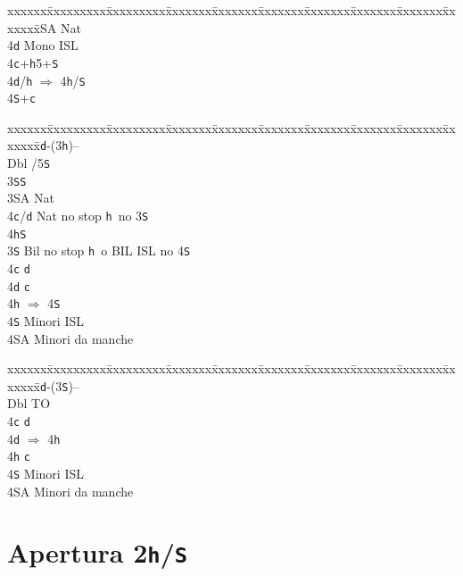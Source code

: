 \documentclass[a4paper,italian]{article}
\newcommand{\BS}{\small{\texttt{S}}}
\newcommand{\BC}{\small{\texttt{c}}}
\newcommand{\BD}{\small{\texttt{d}}}
\newcommand{\BH}{\small{\texttt{h}}}
\newcommand{\pdfh}{\texorpdfstring{\texttt{h}}{H}}
\newcommand{\pdfs}{\texorpdfstring{\texttt{S}}{S}}
\newenvironment{bidtable}
{\begin{tabbing}

    xxxxxx\=xxxxxxxxx\=xxxxxxxxx\=xxxxxxx\=xxxxxxx\=xxxxxxx\=xxxxxxx\=xxxxxxx\=xxxxxxx\=xxxxxxx\=\kill}
{\end{tabbing} }%
\begin{document}
\begin{multicols}{2}
\begin{bidtable}
        3\small{SA} \> Nat\+\\
        4\BD \> Mono ISL\-\-\\
        4\BC {}+\BH5+\BS\\
        4\BD/\BH \> $\Rightarrow$ 4\BH /\BS \\
        4\BS {}+\BC \-
    \end{bidtable}
    \begin{bidtable}
        2\BD-(3\BH)--\+\\
        Dbl /5\BS\ \+\\
        3\BS{}\BS\ \\
        3\small{SA}\> Nat\\
        4\BC/\BD\> Nat no stop \BH\ no 3\BS\ \\
        4\BH{}\BS \-\\
        3\BS \> Bil no stop \BH\ o BIL ISL no 4\BS \\
        4\BC \> \BD \\
        4\BD \> \BC \\
        4\BH \> $\Rightarrow$ 4\BS \\
        4\BS \> Minori ISL\\
        4\small{SA} \> Minori da manche\-
    \end{bidtable}
    \begin{bidtable}
        2\BD-(3\BS)--\+\\
        Dbl \> TO\\
        4\BC \> \BD \\
        4\BD \> $\Rightarrow$ 4\BH \\
        4\BH \> \BC \\
        4\BS \> Minori ISL\\
        4\small{SA} \> Minori da manche\-
    \end{bidtable}
\end{multicols}

\newpage

\section{Apertura 2\pdfh/\pdfs}
\end{document}
